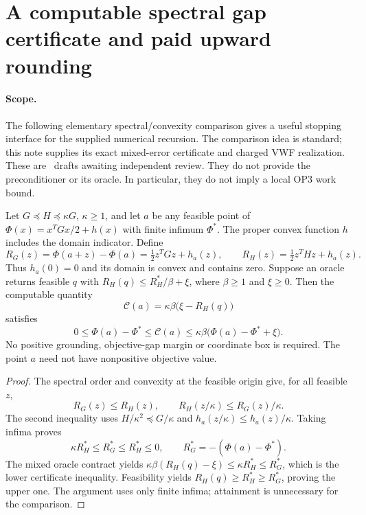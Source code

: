 \section[General spectral gap certificates]{A computable spectral gap certificate and paid upward rounding}
\label{sec:op3-spectral-vwf-certificate}

\paragraph{Scope.}
The following elementary spectral/convexity comparison gives a useful
stopping interface for the supplied numerical recursion. The comparison
idea is standard; this note supplies its exact mixed-error certificate
and charged VWF realization. These are \statusproved\ drafts awaiting
independent review. They do not provide the preconditioner or its oracle.
In particular, they do not imply a local OP3 work bound.

\begin{theorem}
\label{thm:op3-spectral-vwf-gap-certificate}
Let $G\preceq H\preceq\kappa G$, $\kappa\geq1$, and let $a$ be
any feasible point of $\Phi(x)=x^TGx/2+h(x)$ with finite infimum
$\Phi^*$. The proper convex function $h$ includes the domain indicator.
Define
\[
 R_G(z)=\Phi(a+z)-\Phi(a)=\tfrac12z^TGz+h_a(z),\qquad
 R_H(z)=\tfrac12z^THz+h_a(z).
\]
Thus $h_a(0)=0$ and its domain is convex and contains zero.
Suppose an oracle returns feasible $q$ with
$R_H(q)\leq R_H^*/\beta+\xi$, where $\beta\geq1$ and $\xi\geq0$.
Then the computable quantity
\begin{equation}
 \mathcal C(a)=\kappa\beta\bigl(\xi-R_H(q)\bigr)
 \label{eq:op3-spectral-vwf-gap-certificate}
\end{equation}
satisfies
\[
 0\leq\Phi(a)-\Phi^*\leq\mathcal C(a)
 \leq\kappa\beta\bigl(\Phi(a)-\Phi^*+\xi\bigr).
\]
No positive grounding, objective-gap margin or coordinate box is required.
The point $a$ need not have nonpositive objective value.
\end{theorem}
\begin{proof}
The spectral order and convexity at the feasible origin give, for all
feasible $z$,
\[
 R_G(z)\leq R_H(z),\qquad
 R_H(z/\kappa)\leq R_G(z)/\kappa.
\]
The second inequality uses $H/\kappa^2\preceq G/\kappa$ and
$h_a(z/\kappa)\leq h_a(z)/\kappa$. Taking infima proves
\[
 \kappa R_H^*\leq R_G^*\leq R_H^*\leq0,
 \qquad R_G^*=-(\Phi(a)-\Phi^*).
\]
The mixed oracle contract yields
$\kappa\beta(R_H(q)-\xi)\leq\kappa R_H^*\leq R_G^*$,
which is the lower certificate inequality. Feasibility yields
$R_H(q)\geq R_H^*\geq R_G^*$, proving the upper one. The argument
uses only finite infima; attainment is unnecessary for the comparison.
\end{proof}


